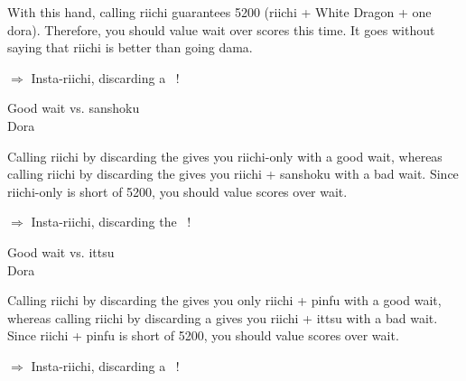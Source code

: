 \noindent With this hand, calling {\jap riichi} guarantees 5200 ({\jap riichi} + White Dragon + one {\jap dora}). Therefore, you should value wait over scores this time. It goes without saying that {\jap riichi} is better than going {\jap dama}. 

\begin{center}
{\large $\Rightarrow$ Insta-{\jap riichi}, discarding a ~!}
\end{center}

\bigskip
\begin{itembox}[r]{Good wait vs. {\jap sanshoku}}
\bp
{}~~\bei\\
\hspace{311pt}\footnotesize{\jap Dora}
\ep {}
\vspace{-15pt}
\end{itembox}

\noindent Calling {\jap riichi} by discarding the {\large {}} gives you {\jap riichi}-only with a good wait, whereas calling {\jap riichi} by discarding the {\large {}} gives you {\jap riichi} + {\jap sanshoku} with a bad wait. Since {\jap riichi}-only is short of 5200, you should value scores over wait. 

\begin{center}
{\large $\Rightarrow$ Insta-{\jap riichi}, discarding the ~!}
\end{center}

\bigskip
\begin{itembox}[r]{Good wait vs. {\jap ittsu}}
\bp
{}~~\bei\\
\hspace{311pt}\footnotesize{\jap Dora}
\ep {}
\vspace{-15pt}
\end{itembox}

\noindent Calling {\jap riichi} by discarding the {\large {}} gives you only {\jap riichi} + {\jap pinfu} with a good wait, whereas calling {\jap riichi} by discarding a {\large {}} gives you {\jap riichi} + {\jap ittsu} with a bad wait. Since {\jap riichi} + {\jap pinfu} is short of 5200, you should value scores over wait. 
\begin{center}
{\large $\Rightarrow$ Insta-{\jap riichi}, discarding a ~!}
\end{center}


